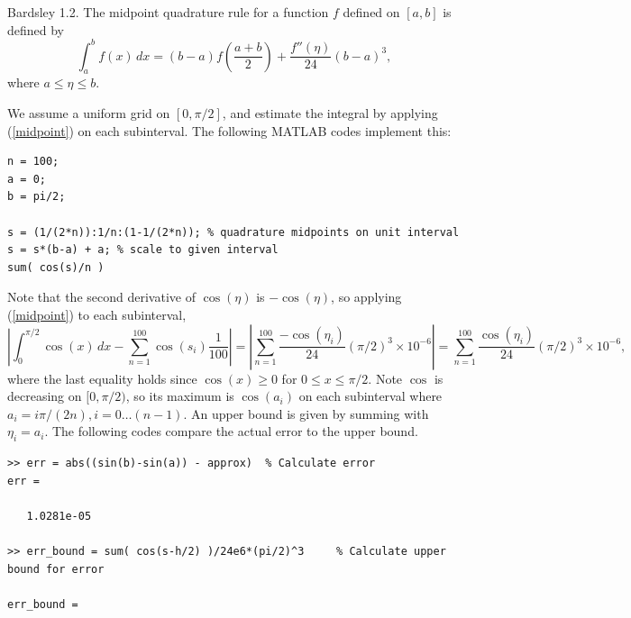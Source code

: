 \documentclass{homework}
\begin{document}
\begin{longproblem}
  Bardsley 1.2. The midpoint quadrature rule for a function $f$ defined on $[a,b]$ is defined by 
  \begin{equation}
    \int_a^b f(x)\,dx= (b-a)f\left(\frac{a+b}2\right) + \frac{f''(\eta)}{24}(b-a)^3,\tag{1.26}\label{midpoint}
  \end{equation}
  where $a\le\eta\le b.$


  \begin{solution}
    We assume a uniform grid on $[0,\pi/2]$, and estimate the integral by applying (\ref{midpoint}) on each subinterval.  The following MATLAB codes implement this:
\begin{lstlisting}
n = 100;
a = 0;
b = pi/2;

s = (1/(2*n)):1/n:(1-1/(2*n)); % quadrature midpoints on unit interval
s = s*(b-a) + a; % scale to given interval
sum( cos(s)/n )
\end{lstlisting}
  \end{solution}

  
  \begin{solution}
  Note that the second derivative of $\cos(\eta)$ is $-\cos(\eta)$, so applying (\ref{midpoint}) to each subinterval,
  $$
  \left|\int_0^{\pi/2} \cos(x)\,dx - \sum_{n=1}^{100} \cos( s_i ) \frac 1{100} \right|  =  \left|\sum_{n=1}^{100} \frac{-\cos(\eta_i)}{24}(\pi/2)^3\times 10^{-6}\right| = \sum_{n=1}^{100} \frac{\cos(\eta_i)}{24}(\pi/2)^3\times 10^{-6},
  $$
  where the last equality holds since $\cos(x) \ge 0$ for $0\le x\le\pi/2$. Note $\cos$ is decreasing on $[0,\pi/2)$, so its maximum is $\cos(a_i)$ on each subinterval where $a_i = i\pi/(2n),i=0\dots (n-1)$.  An upper bound is given by summing with $\eta_i=a_i$.  The following codes compare the actual error to the upper bound.
  \begin{lstlisting}
>> err = abs((sin(b)-sin(a)) - approx)  % Calculate error
err =

   1.0281e-05

>> err_bound = sum( cos(s-h/2) )/24e6*(pi/2)^3     % Calculate upper bound for error 

err_bound =


\end{lstlisting}
\end{solution}
\end{longproblem}
\end{document}
